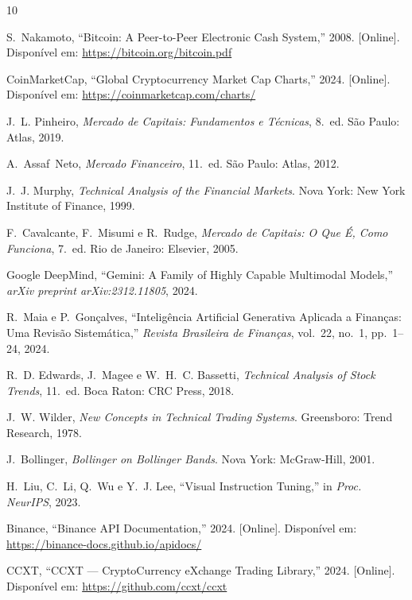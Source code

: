 \documentclass[conference]{IEEEtran}
\begin{document}
\begin{thebibliography}{10}

S.~Nakamoto,
``Bitcoin: A Peer-to-Peer Electronic Cash System,''
2008. [Online]. Disponível em: \url{https://bitcoin.org/bitcoin.pdf}

CoinMarketCap,
``Global Cryptocurrency Market Cap Charts,''
2024. [Online]. Disponível em: \url{https://coinmarketcap.com/charts/}

J.~L. Pinheiro,
\textit{Mercado de Capitais: Fundamentos e Técnicas}, 8.~ed.
São Paulo: Atlas, 2019.

A.~Assaf~Neto,
\textit{Mercado Financeiro}, 11.~ed.
São Paulo: Atlas, 2012.

J.~J. Murphy,
\textit{Technical Analysis of the Financial Markets}.
Nova York: New York Institute of Finance, 1999.

F.~Cavalcante, F.~Misumi e R.~Rudge,
\textit{Mercado de Capitais: O Que É, Como Funciona}, 7.~ed.
Rio de Janeiro: Elsevier, 2005.

Google DeepMind,
``Gemini: A Family of Highly Capable Multimodal Models,''
\textit{arXiv preprint arXiv:2312.11805}, 2024.

R.~Maia e P.~Gonçalves,
``Inteligência Artificial Generativa Aplicada a Finanças: Uma Revisão Sistemática,''
\textit{Revista Brasileira de Finanças}, vol.~22, no.~1, pp.~1--24, 2024.

R.~D. Edwards, J.~Magee e W.~H.~C. Bassetti,
\textit{Technical Analysis of Stock Trends}, 11.~ed.
Boca Raton: CRC Press, 2018.

J.~W. Wilder,
\textit{New Concepts in Technical Trading Systems}.
Greensboro: Trend Research, 1978.

J.~Bollinger,
\textit{Bollinger on Bollinger Bands}.
Nova York: McGraw-Hill, 2001.

H.~Liu, C.~Li, Q.~Wu e Y.~J. Lee,
``Visual Instruction Tuning,''
in \textit{Proc. NeurIPS}, 2023.

Binance,
``Binance API Documentation,''
2024. [Online]. Disponível em: \url{https://binance-docs.github.io/apidocs/}

CCXT,
``CCXT — CryptoCurrency eXchange Trading Library,''
2024. [Online]. Disponível em: \url{https://github.com/ccxt/ccxt}


\end{thebibliography}
\end{document}
